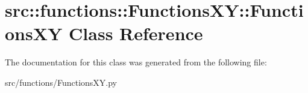 \hypertarget{classsrc_1_1functions_1_1FunctionsXY_1_1FunctionsXY}{
\section{src::functions::FunctionsXY::FunctionsXY Class Reference}
\label{classsrc_1_1functions_1_1FunctionsXY_1_1FunctionsXY}
}


The documentation for this class was generated from the following file:\begin{DoxyCompactItemize}
\item 
src/functions/FunctionsXY.py\end{DoxyCompactItemize}
